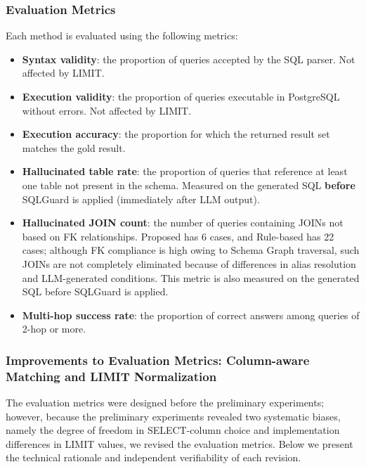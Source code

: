\documentclass[5p,twocolumn]{elsarticle}
\begin{document}
\subsubsection{Evaluation Metrics}
\label{sec:metrics}

Each method is evaluated using the following metrics:

\begin{itemize}
  \item \textbf{Syntax validity}: the proportion of queries accepted by the SQL parser. Not affected by LIMIT.
  \item \textbf{Execution validity}: the proportion of queries executable in PostgreSQL without errors. Not affected by LIMIT.
  \item \textbf{Execution accuracy}: the proportion for which the returned result set matches the gold result.
  \item \textbf{Hallucinated table rate}: the proportion of queries that reference at least one table not present in the schema.
    Measured on the generated SQL \textbf{before} SQLGuard is applied (immediately after LLM output).
  \item \textbf{Hallucinated JOIN count}: the number of queries containing JOINs not based on FK relationships.
    Proposed has 6 cases, and Rule-based has 22 cases;
    although FK compliance is high owing to Schema Graph traversal, such JOINs are not completely eliminated because of differences in alias resolution and LLM-generated conditions.
    This metric is also measured on the generated SQL before SQLGuard is applied.
  \item \textbf{Multi-hop success rate}: the proportion of correct answers among queries of 2-hop or more.
\end{itemize}

\subsubsection{Improvements to Evaluation Metrics: Column-aware Matching and LIMIT Normalization}
\label{sec:metric_improvements}

The evaluation metrics were designed before the preliminary experiments;
however, because the preliminary experiments revealed two systematic biases, namely the degree of freedom in SELECT-column choice and implementation differences in LIMIT values,
we revised the evaluation metrics.
Below we present the technical rationale and independent verifiability of each revision.
\end{document}

